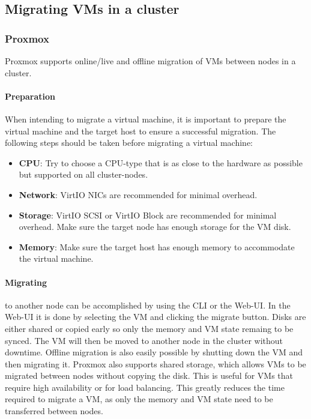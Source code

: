 \subsection{Migrating VMs in a cluster}

\subsubsection{Proxmox}
Proxmox supports online/live and offline migration of VMs between nodes in a cluster. 
\paragraph{Preparation} When intending to migrate a virtual machine, it is important to prepare the virtual machine and the target host to ensure a successful migration. The following steps should be taken before migrating a virtual machine:
\begin{itemize}
    \item \textbf{CPU}: Try to choose a CPU-type that is as close to the hardware as possible but supported on all cluster-nodes.
    \item \textbf{Network}: VirtIO NICs are recommended for minimal overhead.
    \item \textbf{Storage}: VirtIO SCSI or VirtIO Block are recommended for minimal overhead. Make sure the target node has enough storage for the VM disk.
    \item \textbf{Memory}: Make sure the target host has enough memory to accommodate the virtual machine.
\end{itemize}

\paragraph{Migrating} to another node can be accomplished by using the CLI or the Web-UI. In the Web-UI it is done by selecting the VM and clicking the migrate button. Disks are either shared or copied early so only the memory and VM state remaing to be synced. The VM will then be moved to another node in the cluster without downtime. Offline migration is also easily possible by shutting down the VM and then migrating it.\newline
Proxmox also supports shared storage, which allows VMs to be migrated between nodes without copying the disk. This is useful for VMs that require high availability or for load balancing. This greatly reduces the time required to migrate a VM, as only the memory and VM state need to be transferred between nodes.

